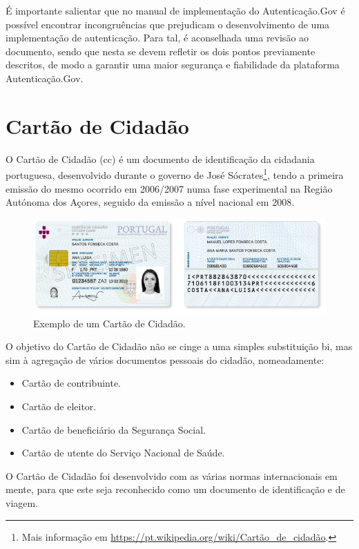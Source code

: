 É importante salientar que no manual de implementação do Autenticação.Gov é possível encontrar incongruências que prejudicam o desenvolvimento de uma implementação de autenticação. Para tal, é aconselhada uma revisão ao documento, sendo que nesta se devem refletir os dois pontos previamente descritos, de modo a garantir uma maior segurança e fiabilidade da plataforma Autenticação.Gov.

\newpage
\section{Cartão de Cidadão}

O Cartão de Cidadão (\gls{cc}) é um documento de identificação da cidadania portuguesa, desenvolvido durante o governo de José Sócrates\footnote{Mais informação em \url{https://pt.wikipedia.org/wiki/Cartão_de_cidadão}.}, tendo a primeira emissão do mesmo ocorrido em 2006/2007 numa fase experimental na Região Autónoma dos Açores, seguido da emissão a nível nacional em 2008.

\begin{figure}[h]
    \centering
    \includegraphics[width=\textwidth]{img/cc/CartaoCidadao.png}
    \caption{Exemplo de um Cartão de Cidadão\cite{ccPic}.}
\end{figure}

O objetivo do Cartão de Cidadão não se cinge a uma simples substituição \gls{bi}, mas sim à agregação de vários documentos pessoais do cidadão, nomeadamente:

\begin{itemize}
    \item Cartão de contribuinte.
    \item Cartão de eleitor.
    \item Cartão de beneficiário da Segurança Social.
    \item Cartão de utente do Serviço Nacional de Saúde.
\end{itemize}

O Cartão de Cidadão foi desenvolvido com as várias normas internacionais em mente, para que este seja reconhecido como um documento de identificação e de viagem.

